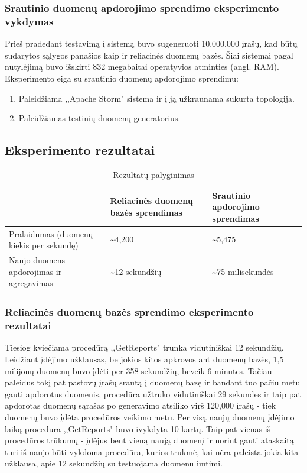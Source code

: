 \documentclass{VUMIFPSkursinis}
\begin{document}
\subsubsection{Srautinio duomenų apdorojimo sprendimo eksperimento vykdymas}

Prieš pradedant testavimą į sistemą buvo sugeneruoti 10,000,000 įrašų, kad būtų sudarytos sąlygos panašios kaip ir reliacinės duomenų bazės.
Šiai sistemai pagal nutylėjimą buvo išskirti 832 megabaitai operatyvios atminties (angl. RAM). 
Eksperimento eiga su srautinio duomenų apdorojimo sprendimu:
\begin{enumerate} 
\item Paleidžiama ,,Apache Storm" sistema ir į ją užkraunama sukurta topologija.
\item Paleidžiamas testinių duomenų generatorius.
\end{enumerate}
\newpage
\subsection{Eksperimento rezultatai}
\begin{table}[!htbp]
    \begin{center}
        \caption{Rezultatų palyginimas}
        \label{table:results}
        \begin{tabular}{ | l | p{4cm} | p{3cm} | } 
            \hline
              & Reliacinės duomenų bazės sprendimas & Srautinio apdorojimo sprendimas \\* \hline
            Pralaidumas (duomenų kiekis per sekundę) & \textasciitilde4,200 & \textasciitilde5,475 \\* \hline
            Naujo duomens apdorojimas ir agregavimas  & \textasciitilde12 sekundžių & \textasciitilde75 milisekundės\\* \hline
        \end{tabular}
    \end{center}
\end{table}\par
\subsubsection{Reliacinės duomenų bazės sprendimo eksperimento rezultatai}
Tiesiog kviečiama procedūrą ,,GetReports" trunka vidutiniškai 12 sekundžių. Leidžiant įdėjimo užklausas, be jokios kitos apkrovos ant duomenų bazės, 1,5 milijonų duomenų
buvo įdėti per 358 sekundžių, beveik 6 minutes. Tačiau paleidus tokį pat pastovų įrašų srautą į duomenų bazę ir bandant tuo pačiu metu gauti apdorotus duomenis,
procedūra užtruko vidutiniškai 29 sekundes ir taip pat apdorotas duomenų sąrašas po generavimo atsiliko virš 120,000 įrašų - tiek duomenų buvo įdėta procedūros veikimo metu. 
Per visą naujų duomenų įdėjimo laiką procedūra ,,GetReports" buvo ivykdyta 10 kartų.
Taip pat vienas iš procedūros trūkumų - įdėjus bent vieną naują duomenį ir norint gauti ataskaitą turi iš naujo būti vykdoma procedūra, kurios trukmė, kai nėra 
paleista jokia kita užklausa, apie 12 sekundžių su testuojama duomenu imtimi.
\end{document}
